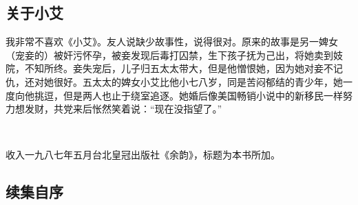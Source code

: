 \subsection{关于小艾}



\par 我非常不喜欢《小艾》。友人说缺少故事性，说得很对。原来的故事是另一婢女（宠妾的）被奸污怀孕，被妾发现后毒打囚禁，生下孩子抚为己出，将她卖到妓院，不知所终。妾失宠后，儿子归五太太带大，但是他憎恨她，因为她对妾不记仇，还对她很好。五太太的婢女小艾比他小七八岁，同是苦闷郁结的青少年，她一度向他挑逗，但是两人也止于绕室追逐。她婚后像美国畅销小说中的新移民一样努力想发财，共党来后怅然笑着说：“现在没指望了。”
\par  
\par *收入一九八七年五月台北皇冠出版社《余韵》，标题为本书所加。


\subsection{续集自序}


